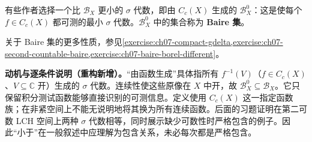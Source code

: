 \documentclass[../../main.tex]{subfiles}
\begin{document}
\begin{definition}[Baire 集]\label{definition:ch07-baire-sets}
有些作者选择一个比 $\mathscr B_X$ 更小的 $\sigma$ 代数，即由 $C_c(X)$ 生成的 $\mathscr B_X^0$：这是使每个 $f\in C_c(X)$ 都可测的最小 $\sigma$ 代数。$\mathscr B_X^0$ 中的集合称为 \textbf{Baire 集}。
\end{definition}
关于 Baire 集的更多性质，参见\cref{exercise:ch07-compact-gdelta,exercise:ch07-second-countable-baire,exercise:ch07-baire-borel-different}。
\begin{remark}
\textbf{动机与逐条件说明（重构新增）。}“由函数生成”具体指所有 $f^{-1}(V)$（$f\in C_c(X)$、$V\subseteq\mathbb C$ 开）生成的 $\sigma$ 代数。连续性使这些原像在 $X$ 中开，故 $\mathscr B_X^0\subseteq\mathscr B_X$。它只保留积分测试函数能够直接识别的可测信息。定义使用 $C_c(X)$ 这一指定函数族；在非紧空间上不能无说明地将其换为所有连续函数。后面的习题证明在第二可数 LCH 空间上两种 $\sigma$ 代数相等，同时展示缺少可数性时严格包含的例子。因此“小于”在一般叙述中应理解为包含关系，未必每次都是严格包含。
\end{remark}
\end{document}
